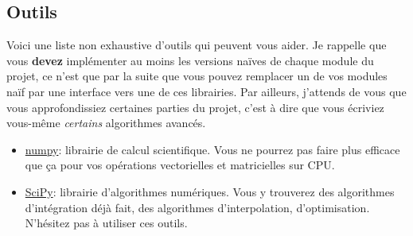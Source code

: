 \documentclass{article}
\begin{document}
\subsection{Outils}
\label{outils}

Voici une liste non exhaustive d'outils qui peuvent vous aider. Je rappelle que vous \textbf{devez} implémenter au moins les versions naïves de chaque module du projet, ce n'est que par la suite que vous pouvez remplacer un de vos modules naïf par une interface vers une de ces librairies. Par ailleurs, j'attends de vous que vous approfondissiez certaines parties du projet, c'est à dire que vous écriviez vous-même \emph{certains} algorithmes avancés.
\begin{itemize}
    \item \href{https://numpy.org/}{numpy}: librairie de calcul scientifique. Vous ne pourrez pas faire plus efficace que ça pour vos opérations vectorielles et matricielles sur CPU.
    \item \href{https://docs.scipy.org/doc/scipy/reference/}{SciPy}: librairie d'algorithmes numériques. Vous y trouverez des algorithmes d'intégration déjà fait, des algorithmes d'interpolation, d'optimisation. N'hésitez pas à utiliser ces outils.
\end{itemize}
\end{document}

